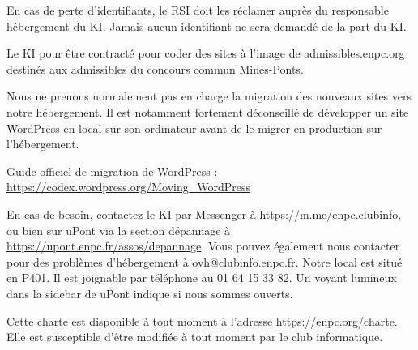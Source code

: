 \documentclass{ki019}
\begin{document}

En cas de perte d'identifiants, le RSI doit les réclamer auprès du responsable hébergement du KI. Jamais aucun identifiant ne sera demandé de la part du KI.



Le KI pour être contracté pour coder des sites à l'image de admissibles.enpc.org destinés aux admissibles du concours commun Mines-Ponts.


Nous ne prenons normalement pas en charge la migration des nouveaux sites vers notre hébergement.
Il est notamment fortement déconseillé de développer un site WordPress en local sur son ordinateur avant de le migrer en production sur l'hébergement.

Guide officiel de migration de WordPress : \url{https://codex.wordpress.org/Moving_WordPress}


En cas de besoin, contactez le KI par Messenger à \url{https://m.me/enpc.clubinfo}, ou bien sur uPont via la section dépannage à \url{https://upont.enpc.fr/assos/depannage}.
Vous pouvez également nous contacter pour des problèmes d'hébergement à ovh@clubinfo.enpc.fr.
Notre local est situé en P401. Il est joignable par téléphone au 01 64 15 33 82.
Un voyant lumineux dans la sidebar de uPont indique si nous sommes ouverts.

Cette charte est disponible à tout moment à l'adresse \url{https://enpc.org/charte}. Elle est susceptible d'être modifiée à tout moment par le club informatique.

\Footer{\today}
\end{document}
